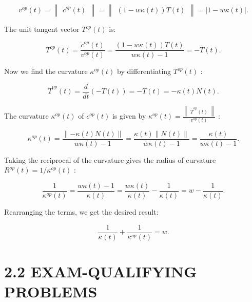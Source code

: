 \documentclass[10pt]{article}
\begin{document}
\[
{v}^{op}\left( t\right)  = \begin{Vmatrix}{{\dot{c}}^{op}\left( t\right) }\end{Vmatrix} = \begin{Vmatrix}{\left( {1 - {w\kappa }\left( t\right) }\right) T\left( t\right) }\end{Vmatrix} = \left| {1 - {w\kappa }\left( t\right) }\right| .
\]

The unit tangent vector \({T}^{op}\left( t\right)\) is:

\[
{T}^{op}\left( t\right)  = \frac{{\dot{c}}^{op}\left( t\right) }{{v}^{op}\left( t\right) } = \frac{\left( {1 - {w\kappa }\left( t\right) }\right) T\left( t\right) }{{w\kappa }\left( t\right)  - 1} =  - T\left( t\right) .
\]

Now we find the curvature \({\kappa }^{op}\left( t\right)\) by differentiating \({T}^{op}\left( t\right)\) :

\[
{\dot{T}}^{op}\left( t\right)  = \frac{d}{dt}\left( {-T\left( t\right) }\right)  =  - \dot{T}\left( t\right)  =  - \kappa \left( t\right) N\left( t\right) .
\]

The curvature \({\kappa }^{op}\left( t\right)\) of \({c}^{op}\left( t\right)\) is given by \({\kappa }^{op}\left( t\right)  = \frac{\begin{Vmatrix}{\dot{T}}^{op}\left( t\right) \end{Vmatrix}}{{v}^{op}\left( t\right) }\) :

\[
{\kappa }^{op}\left( t\right)  = \frac{\parallel  - \kappa \left( t\right) N\left( t\right) \parallel }{{w\kappa }\left( t\right)  - 1} = \frac{\kappa \left( t\right) \parallel N\left( t\right) \parallel }{{w\kappa }\left( t\right)  - 1} = \frac{\kappa \left( t\right) }{{w\kappa }\left( t\right)  - 1}.
\]

Taking the reciprocal of the curvature gives the radius of curvature \({R}^{op}\left( t\right)  = 1/{\kappa }^{op}\left( t\right)\) :

\[
\frac{1}{{\kappa }^{op}\left( t\right) } = \frac{{w\kappa }\left( t\right)  - 1}{\kappa \left( t\right) } = \frac{{w\kappa }\left( t\right) }{\kappa \left( t\right) } - \frac{1}{\kappa \left( t\right) } = w - \frac{1}{\kappa \left( t\right) }.
\]

Rearranging the terms, we get the desired result:

\[
\frac{1}{\kappa \left( t\right) } + \frac{1}{{\kappa }^{op}\left( t\right) } = w.
\]

\section*{2.2 EXAM-QUALIFYING PROBLEMS}
\end{document}
